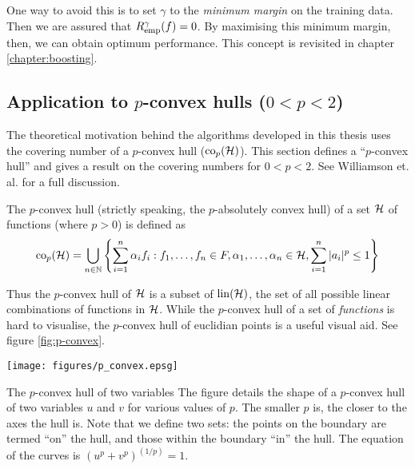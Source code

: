 One way to avoid this is to set $\gamma$ to the \emph{minimum margin}
on the training data.  Then we are assured that $R_{\mathrm{emp}}^{\gamma}(f)
= 0$.  By maximising this minimum margin, then, we can obtain optimum
performance.  This concept is revisited in chapter
\ref{chapter:boosting}.


\subsection{Application to $p$-convex hulls ($0 < p < 2$)}
\label{sec:p-convex}

The theoretical motivation behind the algorithms developed in this
thesis uses the covering number of a $p$-convex hull ($\mathrm{co}_p(\mathcal{H})$).
This section defines a ``$p$-convex hull'' and gives a result on the covering
numbers for $0 < p < 2$.  See Williamson et. al. \cite{Williamson99}
for a full discussion.

\begin{definition}
The $p$-convex hull (strictly speaking, the $p$-absolutely convex hull) of
a set $\mathcal{H}$ of functions (where $p>0$) is defined as
%
\begin{equation}
\mathrm{co}_p (\mathcal{H}) =
 \bigcup _{n \in \mathbb{N}}
\left\{
 \sum_{i=1}^{n}
 \alpha _i
f_i : f_1, \ldots, f_n \in F,
 \alpha _1, \ldots, \alpha _n \in \mathbb{\mathcal{H}},
 \sum_{i=1}^{n} | a_i |^p \leq 1
\right\}
\end{equation}
\end{definition}

Thus the $p$-convex hull of $\mathcal{H}$ is a subset of $\mathrm{lin}(\mathcal{H})$, the
set of all possible linear combinations of functions in $\mathcal{H}$.
While the $p$-convex hull of a set of \emph{functions} is hard to
visualise, the $p$-convex hull of euclidian points is a useful visual
aid.  See figure \ref{fig:p-convex}.

\begin{linefigure}
\begin{center}
\texttt{[image: figures/p\_convex.epsg]}
\end{center}
\begin{capt}{The $p$-convex hull of two variables}
The figure details the shape of a $p$-convex hull of two variables $u$
and $v$ for various values of $p$.  The smaller $p$ is, the closer to
the axes the hull is.  Note that we define two sets: the points on the
boundary are termed ``on'' the hull, and those within the boundary
``in'' the hull.  The equation of the curves is $\left( u^p + v^p
\right) ^{(1/p)} = 1$.
\end{capt}
\end{linefigure}

